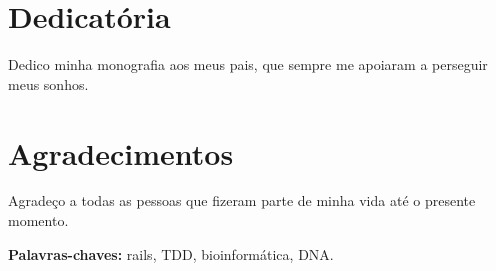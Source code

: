 \documentclass[12pt,times,a4paper,twoside]{icmc}
\begin{document}
\thispagestyle{plain}  
\setcounter{page}{1}

\chapter*{Dedicatória}

Dedico minha monografia aos meus pais, que sempre me apoiaram a perseguir meus sonhos.

\chapter*{Agradecimentos}

Agradeço a todas as pessoas que fizeram parte de minha vida até o presente momento.





\noindent \textbf{Palavras-chaves:} rails, TDD, bioinformática, DNA.

\tableofcontents
\lstlistoflistings
\printglossary[title=Lista de Termos,toctitle=Termos e Abreviaturas]

\onehalfspacing

\mainmatter

\renewcommand{\chaptermark}[1]{%

\markboth{\chaptername
\ \thechapter.\ #1}{}}  %

\renewcommand{\sectionmark}[1]{%
 \markright{\thesection.\ #1}}

%






\renewcommand{\bibname}{Referências}
 
{}

\end{document}
